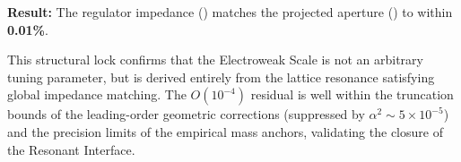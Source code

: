 \textbf{Result:} The regulator impedance (\HiggsImpedanceVal) matches the projected aperture (\WeakApertureProjVal) to within \textbf{0.01\%}. 

This structural lock confirms that the Electroweak Scale is not an arbitrary tuning parameter, but is derived entirely from the lattice resonance satisfying global impedance matching. The $O(10^{-4})$ residual is well within the truncation bounds of the leading-order geometric corrections (suppressed by $\alpha^2 \sim 5 \times 10^{-5}$) and the precision limits of the empirical mass anchors, validating the closure of the Resonant Interface.